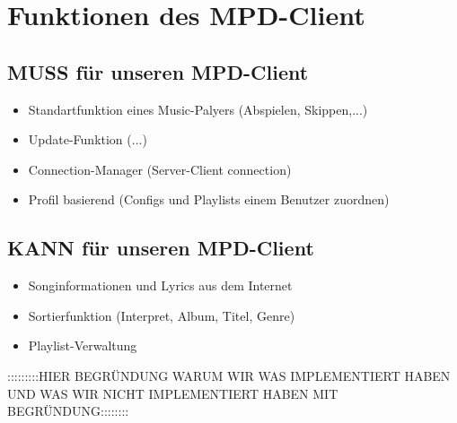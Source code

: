 \chapter{Funktionen des MPD-Client}

\section{MUSS für unseren MPD-Client}

\renewcommand{\labelitemi}{•}
\begin{itemize}
	\item Standartfunktion eines Music-Palyers (Abspielen, Skippen,...)
	\item Update-Funktion (...)
	\item Connection-Manager (Server-Client connection)
	\item Profil basierend (Configs und Playlists einem Benutzer zuordnen)
\end{itemize}

\section{KANN für unseren MPD-Client}
\begin{itemize}
	\item Songinformationen und Lyrics aus dem Internet
	\item Sortierfunktion (Interpret, Album, Titel, Genre)
	\item Playlist-Verwaltung
\end{itemize}

:::::::::HIER BEGRÜNDUNG WARUM WIR WAS IMPLEMENTIERT HABEN UND WAS WIR NICHT IMPLEMENTIERT HABEN MIT BEGRÜNDUNG::::::::